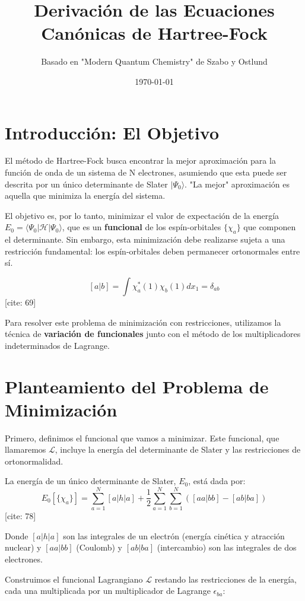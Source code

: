 \documentclass[12pt,a4paper]{article}
\title{Derivación de las Ecuaciones Canónicas de Hartree-Fock}
\author{Basado en "Modern Quantum Chemistry" de Szabo y Ostlund}
\date{\today}
\begin{document}
\maketitle

\section{Introducción: El Objetivo}

El método de Hartree-Fock busca encontrar la mejor aproximación para la función de onda de un sistema de N electrones, asumiendo que esta puede ser descrita por un único determinante de Slater $|\Psi_0\rangle$. "La mejor" aproximación es aquella que minimiza la energía del sistema.

El objetivo es, por lo tanto, minimizar el valor de expectación de la energía $E_0 = \langle\Psi_0|\mathcal{H}|\Psi_0\rangle$, que es un \textbf{funcional} de los espín-orbitales $\{\chi_a\}$ que componen el determinante. Sin embargo, esta minimización debe realizarse sujeta a una restricción fundamental: los espín-orbitales deben permanecer ortonormales entre sí.

$$ [a|b] = \int \chi_a^*(1)\chi_b(1)dx_1 = \delta_{ab} $$ [cite: 69]

Para resolver este problema de minimización con restricciones, utilizamos la técnica de \textbf{variación de funcionales} junto con el método de los multiplicadores indeterminados de Lagrange.

\section{Planteamiento del Problema de Minimización}

Primero, definimos el funcional que vamos a minimizar. Este funcional, que llamaremos $\mathcal{L}$, incluye la energía del determinante de Slater y las restricciones de ortonormalidad.

La energía de un único determinante de Slater, $E_0$, está dada por:
$$ E_0[\{\chi_a\}] = \sum_{a=1}^{N} [a|h|a] + \frac{1}{2} \sum_{a=1}^{N} \sum_{b=1}^{N} ([aa|bb] - [ab|ba]) $$ [cite: 78]

Donde $[a|h|a]$ son las integrales de un electrón (energía cinética y atracción nuclear) y $[aa|bb]$ (Coulomb) y $[ab|ba]$ (intercambio) son las integrales de dos electrones.

Construimos el funcional Lagrangiano $\mathcal{L}$ restando las restricciones de la energía, cada una multiplicada por un multiplicador de Lagrange $\epsilon_{ba}$:
\end{document}
